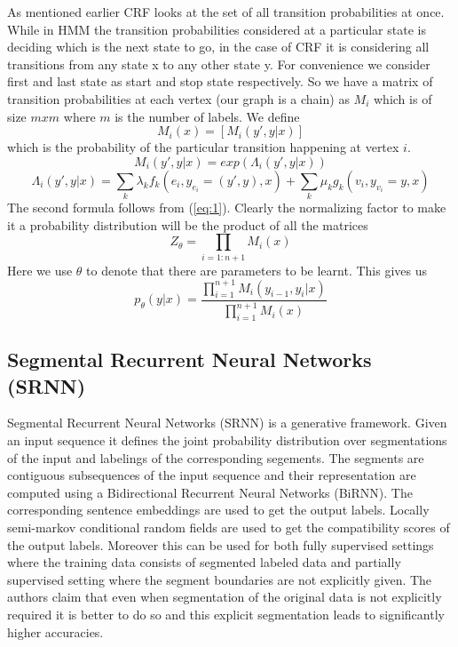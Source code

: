 \documentclass[letterpaper]{article} %
\begin{document}
As mentioned earlier CRF looks at the set of all transition probabilities at once. While in HMM the transition probabilities considered at a particular state is deciding which is the next state to go, in the case of CRF it is considering all transitions from any state x to any other state y. For convenience we consider first and last state as start and stop state respectively. So we have a matrix of transition probabilities at each vertex (our graph is a chain) as $M_i$ which is of size $m x m$ where $m$ is the number of labels. We define $$M_i(x) = [M_i(y', y| x)]$$ which is the probability of the particular transition happening at vertex $i$. $$M_i(y', y| x) = exp(\Lambda_i(y', y|x))$$ $$\Lambda_i(y', y| x) = \sum_k\lambda_kf_k(e_i, y_{e_i}{=}(y', y), x) + \sum_k \mu_k g_k(v_i, y_{v_i}{=}y, x)$$ The second formula follows from (\ref{eq:1}). Clearly the normalizing factor to make it a probability distribution will be the product of all the matrices $$Z_{\theta} = \prod_{i=1:n+1}M_i(x)$$ Here we use $\theta$ to denote that there are parameters to be learnt. This gives us $$p_{\theta}(y|x) = \frac{\prod_{i=1}^{n+1}M_i(y_{i-1}, y_{i}|x)}{\prod_{i=1}^{n+1}M_i(x)}$$



\subsection{Segmental Recurrent Neural Networks (SRNN)}
Segmental Recurrent Neural Networks (SRNN) is a generative framework. Given an input sequence it defines the joint probability distribution over segmentations of the input and labelings of the corresponding segements. The segments are contiguous subsequences of the input sequence and their representation are computed using a Bidirectional Recurrent Neural Networks (BiRNN). The corresponding sentence embeddings are used to get the output labels. Locally semi-markov conditional random fields are used to get the compatibility scores of the output labels. Moreover this can be used for both fully supervised settings where the training data consists of segmented labeled data and partially supervised setting where the segment boundaries are not explicitly given. The authors claim that even when segmentation of the original data is not explicitly required it is better to do so and this explicit segmentation leads to significantly higher accuracies.
\end{document}
